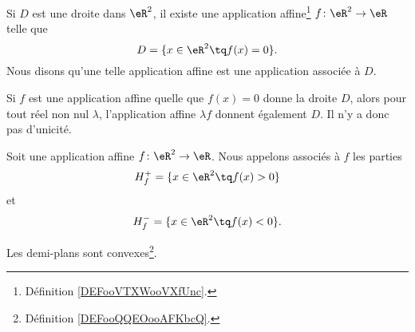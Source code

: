 \begin{proposition}     \label{PROPooOFKXooARiQZK}
    Si \( D\) est une droite dans \( \eR^2\), il existe une application affine\footnote{Définition \ref{DEFooVTXWooVXfUnc}.} \( f\colon \eR^2\to \eR\) telle que
    \begin{equation}
        D=\{ x\in \eR^2\tq f(x)=0 \}.
    \end{equation}
    Nous disons qu'une telle application affine est une application associée à \( D\).
\end{proposition}

Si \( f\) est une application affine quelle que \( f(x)=0\) donne la droite \( D\), alors pour tout réel non nul \( \lambda\), l'application affine \( \lambda f\)  donnent également \( D\). Il n'y a donc pas d'unicité.

\begin{definition}
    Soit une application affine \( f\colon \eR^2\to \eR\). Nous appelons  associés à \( f\) les parties
    \begin{equation}
        H_f^+=\{ x\in \eR^2\tq f(x)>0 \}
    \end{equation}
    et
    \begin{equation}
        H_f^-=\{ x\in \eR^2\tq f(x)<0 \}.
    \end{equation}
\end{definition}


\begin{lemma}        \label{LEMooEZEDooSDbrkq}
    Les demi-plans sont convexes\footnote{Définition \ref{DEFooQQEOooAFKbcQ}.}.
\end{lemma}

